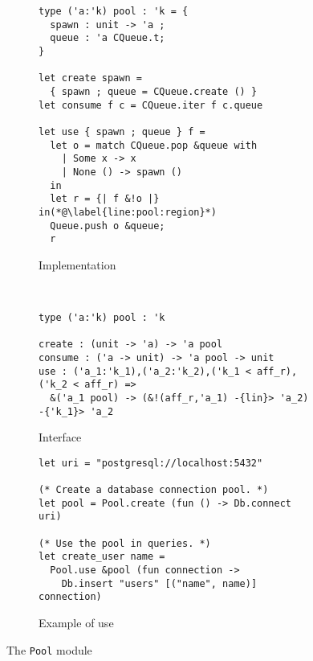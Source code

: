 \begin{figure}[!h]
  \centering
  \begin{subfigure}[t]{.45\linewidth}
\begin{lstlisting}
type ('a:'k) pool : 'k = {
  spawn : unit -> 'a ;
  queue : 'a CQueue.t;
}

let create spawn =
  { spawn ; queue = CQueue.create () }
let consume f c = CQueue.iter f c.queue

let use { spawn ; queue } f =
  let o = match CQueue.pop &queue with
    | Some x -> x
    | None () -> spawn ()
  in
  let r = {| f &!o |} in(*@\label{line:pool:region}*)
  Queue.push o &queue;
  r
\end{lstlisting}
    \caption{Implementation}
    \label{impl:pool}
  \end{subfigure}~
  \begin{subfigure}[t]{.55\linewidth}
\begin{lstlisting}
type ('a:'k) pool : 'k

create : (unit -> 'a) -> 'a pool
consume : ('a -> unit) -> 'a pool -> unit
use : ('a_1:'k_1),('a_2:'k_2),('k_1 < aff_r),('k_2 < aff_r) =>
  &('a_1 pool) -> (&!(aff_r,'a_1) -{lin}> 'a_2) -{'k_1}> 'a_2
\end{lstlisting}
    \caption{Interface}
    \label{intf:pool}

\begin{lstlisting}
let uri = "postgresql://localhost:5432"

(* Create a database connection pool. *)
let pool = Pool.create (fun () -> Db.connect uri)

(* Use the pool in queries. *)
let create_user name =
  Pool.use &pool (fun connection ->
    Db.insert "users" [("name", name)] connection)
\end{lstlisting}
    \caption{Example of use}
    \label{ex:pool}
  \end{subfigure}

  \caption{The \texttt{Pool} module}
  \label{fig:pool}
\end{figure}


